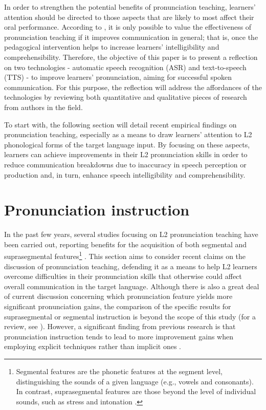 \documentclass[english]{textolivre}
\begin{document}
In order to strengthen the potential benefits of pronunciation teaching, learners’ attention should be directed to those aspects that are likely to most affect their oral performance. According to \textcite{derwing_efficacy_2018}, it is only possible to value the effectiveness of pronunciation teaching if it improves communication in general; that is, once the pedagogical intervention helps to increase learners’ intelligibility and comprehensibility. Therefore, the objective of this paper is to present a reflection on two technologies - automatic speech recognition (ASR) and text-to-speech (TTS) - to improve learners’ pronunciation, aiming for successful spoken communication. For this purpose, the reflection will address the affordances of the technologies by reviewing both quantitative and qualitative pieces of research from authors in the field.

To start with, the following section will detail recent empirical findings on pronunciation teaching, especially as a means to draw learners’ attention to L2 phonological forms of the target language input. By focusing on these aspects, learners can achieve improvements in their L2 pronunciation skills in order to reduce communication breakdowns due to inaccuracy in speech perception or production and, in turn, enhance speech intelligibility and comprehensibility.

\section{Pronunciation instruction}\label{sec-normas}
In the past few years, several studies focusing on L2 pronunciation teaching have been carried out, reporting benefits for the acquisition of both segmental and suprasegmental features\footnote{Segmental features are the phonetic features at the segment level, distinguishing the sounds of a given language (e.g., vowels and consonants). In contrast, suprasegmental features are those beyond the level of individual sounds, such as stress and intonation \cite{yavas_applied_2011}.} \cite{thomson_effectiveness_2014}. This section aims to consider recent claims on the discussion of pronunciation teaching, defending it as a means to help L2 learners overcome difficulties in their pronunciation skills that otherwise could affect overall communication in the target language. Although there is also a great deal of current discussion concerning which pronunciation feature yields more significant pronunciation gains, the comparison of the specific results for suprasegmental or segmental instruction is beyond the scope of this study (for a review, see \cite{gordon_development_2016, lee_effects_2020, zhang_examining_2020}). However, a significant finding from previous research is that pronunciation instruction tends to lead to more improvement gains when employing explicit techniques rather than implicit ones \cite{thomson_effectiveness_2014, gordon_development_2016}.
\end{document}
